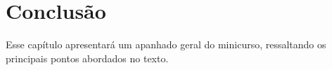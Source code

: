 \documentclass{SBCbookchapter}
\begin{document}

\section{Conclusão}

	Esse capítulo apresentará um apanhado geral do minicurso, ressaltando os
	principais pontos abordados no texto.


\end{document}
